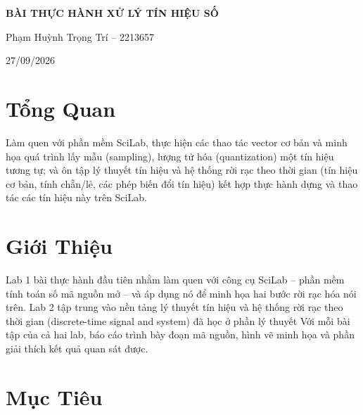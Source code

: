 \documentclass[12pt,a4paper]{article}
\begin{document}
\begin{titlepage}
\centering
\vspace*{1cm}
\vspace{1.5cm}
{\Huge\bfseries BÀI THỰC HÀNH XỬ LÝ TÍN HIỆU SỐ\par}
\vspace{0.5cm}
\vspace{2.5cm}
{\large Phạm Huỳnh Trọng Trí -- 2213657\par}
\vfill
{\large 27/09/2026\par}
\end{titlepage}

\tableofcontents
\newpage

\section*{Tổng Quan}

Làm quen với phần mềm SciLab, thực hiện các
thao tác vector cơ bản và minh họa quá trình lấy mẫu (sampling), lượng tử hóa
(quantization) một tín hiệu tương tự; và ôn tập lý thuyết tín
hiệu và hệ thống rời rạc theo thời gian (tín hiệu cơ bản, tính chẵn/lẻ, các phép
biến đổi tín hiệu) kết hợp thực hành dựng và thao tác các tín hiệu này trên SciLab.

\section{Giới Thiệu}

Lab 1 bài thực hành đầu tiên nhằm làm quen với công cụ SciLab -- phần mềm tính
toán số mã nguồn mở -- và áp dụng nó để minh họa hai bước rời rạc hóa nói trên.
Lab 2 tập trung vào nền tảng lý thuyết tín hiệu và hệ thống rời
rạc theo thời gian (discrete-time signal and system) đã học ở phần lý thuyết Với mỗi bài tập của cả hai lab, báo cáo trình bày đoạn
mã nguồn, hình vẽ minh họa và phần giải thích kết quả quan sát được.

\section{Mục Tiêu}
\end{document}
